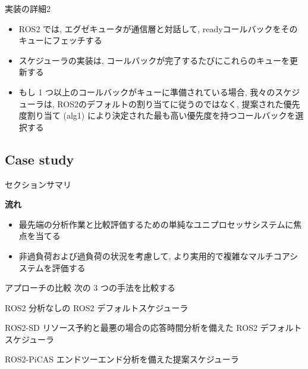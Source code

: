 \begin{frame}{実装の詳細2}
    \begin{itemize}
        \item ROS2 では, エグゼキュータが通信層と対話して, readyコールバックをそのキューにフェッチする
        \item スケジューラの実装は, コールバックが完了するたびにこれらのキューを更新する
        \item もし 1 つ以上のコールバックがキューに準備されている場合, 我々のスケジューラは, ROS2のデフォルトの割り当てに従うのではなく, 提案された優先度割り当て (alg1) により決定された最も高い優先度を持つコールバックを選択する
    \end{itemize}
\end{frame}


\subsection{Case study}
\label{ssec: case study}

\begin{frame}{セクションサマリ}
    \begin{itembox}[l]{\textbf{流れ}}
        \begin{itemize}
            \item 最先端の分析作業と比較評価するための単純なユニプロセッサシステムに焦点を当てる
            \item 非過負荷および過負荷の状況を考慮して, より実用的で複雑なマルチコアシステムを評価する
        \end{itemize}
    \end{itembox}
\end{frame}

\begin{frame}{アプローチの比較}
    次の 3 つの手法を比較する
    \begin{block}{ROS2}
        分析なしの ROS2 デフォルトスケジューラ
    \end{block}
    \begin{block}{ROS2-SD}
        リソース予約と最悪の場合の応答時間分析を備えた ROS2 デフォルトスケジューラ~\cite{casini2019response}
    \end{block}
    \begin{block}{ROS2-PiCAS}
        エンドツーエンド分析を備えた提案スケジューラ
    \end{block}
\end{frame}

